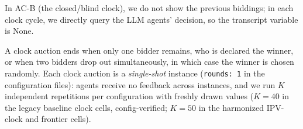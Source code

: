 In AC-B (the closed/blind clock), we do not show the previous biddings; in each clock cycle, we directly query the LLM agents' decision,
so the transcript variable is None.

A clock auction ends when only one bidder remains, who is declared the winner, or when two bidders drop out simultaneously, in which case the winner is chosen randomly. Each clock auction is a \emph{single-shot} instance (\texttt{rounds:\,1} in the configuration files): agents receive no feedback across instances, and we run $K$ independent repetitions per configuration with freshly drawn values ($K=40$ in the legacy baseline clock cells, config-verified; $K=50$ in the harmonized IPV-clock and frontier cells). 
